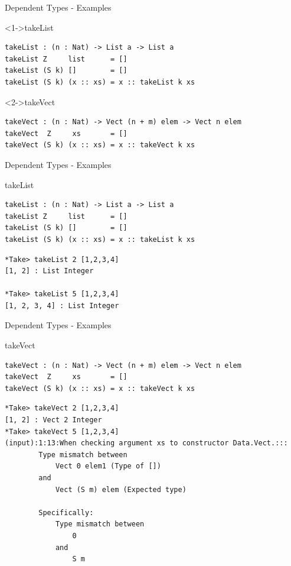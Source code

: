 \documentclass{beamer}
\begin{document}
\begin{frame}[fragile]{Dependent Types - Examples}
	\begin{block}<1->{takeList}
		 \begin{lstlisting}[basicstyle=\ttfamily\scriptsize]
takeList : (n : Nat) -> List a -> List a
takeList Z     list      = []
takeList (S k) []        = []
takeList (S k) (x :: xs) = x :: takeList k xs
		\end{lstlisting}
	\end{block}
\begin{block}<2->{takeVect}
	\begin{lstlisting}[basicstyle=\ttfamily\scriptsize]
takeVect : (n : Nat) -> Vect (n + m) elem -> Vect n elem
takeVect  Z     xs       = []
takeVect (S k) (x :: xs) = x :: takeVect k xs
	\end{lstlisting}
\end{block}
\end{frame}
\begin{frame}[fragile]{Dependent Types - Examples}
	\begin{block}{takeList}
		\begin{lstlisting}[basicstyle=\ttfamily\scriptsize]
takeList : (n : Nat) -> List a -> List a
takeList Z     list      = []
takeList (S k) []        = []
takeList (S k) (x :: xs) = x :: takeList k xs
		\end{lstlisting}
	\end{block}
\begin{block}{}
	\begin{lstlisting}[basicstyle=\ttfamily\scriptsize]
*Take> takeList 2 [1,2,3,4]
[1, 2] : List Integer

*Take> takeList 5 [1,2,3,4]
[1, 2, 3, 4] : List Integer
	\end{lstlisting}
\end{block}
\end{frame}

\begin{frame}[fragile]{Dependent Types - Examples}
	\begin{block}{takeVect}
		\begin{lstlisting}[basicstyle=\ttfamily\scriptsize]
takeVect : (n : Nat) -> Vect (n + m) elem -> Vect n elem
takeVect  Z     xs       = []
takeVect (S k) (x :: xs) = x :: takeVect k xs
		\end{lstlisting}
	\end{block}
	\begin{block}{}
		\begin{lstlisting}[basicstyle=\ttfamily\scriptsize]
*Take> takeVect 2 [1,2,3,4]
[1, 2] : Vect 2 Integer
*Take> takeVect 5 [1,2,3,4]
(input):1:13:When checking argument xs to constructor Data.Vect.:::
		Type mismatch between
			Vect 0 elem1 (Type of [])
		and
			Vect (S m) elem (Expected type)
			
		Specifically:
			Type mismatch between
				0
			and
				S m
		\end{lstlisting}
	\end{block}
\end{frame}
\end{document}
